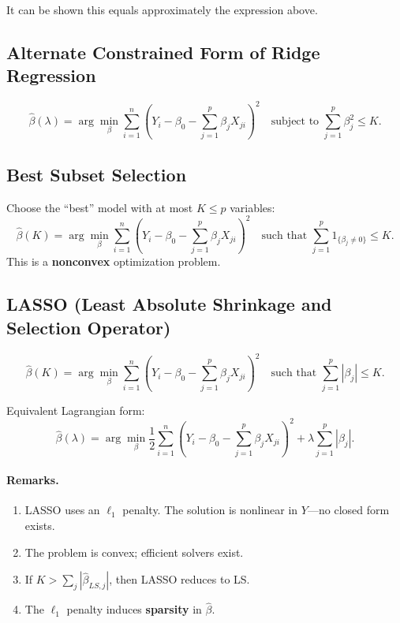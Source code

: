 It can be shown this equals approximately the expression above.

\subsection{Alternate Constrained Form of Ridge Regression}

\[
    \hat{\beta}(\lambda)
    = \arg\min_{\beta}
        \sum_{i=1}^n (Y_i - \beta_0 - \sum_{j=1}^p \beta_j X_{ji})^2
    \quad \text{subject to }
        \sum_{j=1}^p \beta_j^2 \le K.
\]

\subsection{Best Subset Selection}

Choose the ``best'' model with at most $K \le p$ variables:
\[
    \hat{\beta}(K)
    = \arg\min_{\beta}
        \sum_{i=1}^n (Y_i - \beta_0 - \sum_{j=1}^p \beta_j X_{ji})^2
    \quad \text{such that }
        \sum_{j=1}^p 1_{\{\beta_j \ne 0\}} \le K.
\]
This is a \textbf{nonconvex} optimization problem.

\subsection{LASSO (Least Absolute Shrinkage and Selection Operator)}

\[
    \hat{\beta}(K)
    = \arg\min_{\beta}
        \sum_{i=1}^n (Y_i - \beta_0 - \sum_{j=1}^p \beta_j X_{ji})^2
    \quad \text{such that }
        \sum_{j=1}^p |\beta_j| \le K.
\]

Equivalent Lagrangian form:
\[
    \hat{\beta}(\lambda)
    = \arg\min_{\beta}
        \frac{1}{2} \sum_{i=1}^n (Y_i - \beta_0 - \sum_{j=1}^p \beta_j X_{ji})^2
        + \lambda \sum_{j=1}^p |\beta_j|.
\]

\paragraph{Remarks.}
\begin{enumerate}
    \item LASSO uses an $\ell_1$ penalty.  
          The solution is nonlinear in $Y$—no closed form exists.
    \item The problem is convex; efficient solvers exist.
    \item If $K > \sum_j |\hat{\beta}_{LS,j}|$, then LASSO reduces to LS.
    \item The $\ell_1$ penalty induces \textbf{sparsity} in $\hat{\beta}$.
\end{enumerate}

\newpage